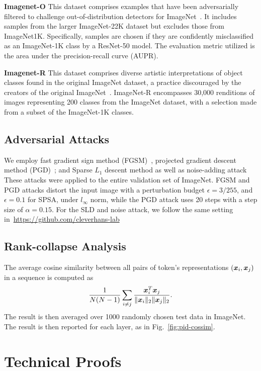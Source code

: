 \textbf{Imagenet-O} This dataset comprises examples that have been adversarially filtered to challenge out-of-distribution detectors for ImageNet~\cite{hendrycks2021natural}. It includes samples from the larger ImageNet-22K dataset but excludes those from ImageNet1K. Specifically, samples are chosen if they are confidently misclassified as an ImageNet-1K class by a ResNet-50 model. The evaluation metric utilized is the area under the precision-recall curve (AUPR).

\textbf{Imagenet-R} This dataset comprises diverse artistic interpretations of object classes found in the original ImageNet dataset, a practice discouraged by the creators of the original ImageNet~\cite{hendrycks2021many}. ImageNet-R encompasses 30,000 renditions of images representing 200 classes from the ImageNet dataset, with a selection made from a subset of the ImageNet-1K classes.
\subsection{Adversarial Attacks}
We employ fast gradient sign method (FGSM)~\cite{dong2020benchmarking}, projected gradient descent method (PGD)~\cite{tramer2019adversarial}; and Sparse $L_1$ descent method as well as noise-adding attack
These attacks were
applied to the entire validation set of ImageNet. FGSM and PGD attacks distort the input image with a perturbation budget $\epsilon= 3/255$, and $\epsilon=0.1$ for SPSA, under $l_{\infty}$ norm, while the PGD attack uses 20 steps with a step size of $\alpha = 0.15$. For the SLD and noise attack, we follow the same setting in~\href{https://github.com/cleverhans-lab}{https://github.com/cleverhans-lab}
\subsection{Rank-collapse Analysis}
\label{secapp:cossim}
The average cosine similarity between all pairs of token's representations $({\bm x}_i, {\bm x}_j)$ in a sequence is computed as
\begin{align}
\nonumber
\frac{1}{N(N - 1)}\sum_{i \neq j}\frac{{\bm x}_i^T{\bm x}_j}{\| {\bm x}_i\|_2\| {\bm x}_j\|_2}.
\end{align} 
The result is then averaged over 1000 randomly chosen test data in ImageNet. The result is then reported for each layer, as in Fig.~\ref{fig:pid-cossim}.
\section{Technical Proofs}
